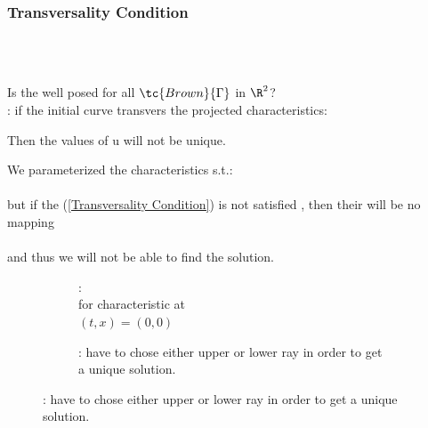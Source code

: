 \subsubsection{Transversality Condition}
\begin{defnbox}
    \begin{defn}\leavevmode \\
        \\
    \end{defn}
\end{defnbox}
\begin{sectionbox}[Question]
    Is the  well posed for all
    $\tc{Brown}{\Gamma}$ in $\R^2$?\\
    : if the initial curve transvers the projected characteristics:
        \begin{numberlist}
            \item {}
            \item {}
        \end{numberlist}
        Then the values of u will not be unique.
\end{sectionbox}
\begin{sectionbox}[Problem]
\nospacing
    We parameterized the characteristics s.t.:\\
    \\
    but if the  (\cref{Transversality Condition}) is not satisfied , then their will be no mapping\\
    \\
    and thus we will not be able to find the solution.
        \begin{figure}[H]
            \centering
            \begin{subfigure}{.5\columnwidth}
                \centering{
                    \def\svgwidth{100pt}
                    \resizebox{\linewidth}{!}{}
                }
                \caption{: \\ for characteristic at\\ $(t,x)=(0,0)$}
            \end{subfigure}%
            \begin{subfigure}{.5\columnwidth}
                \centering{
                    \def\svgwidth{100pt}
                    \resizebox{\linewidth}{!}{}
                }
                \caption{:  have to chose either upper or lower ray in order to get a unique solution.}
            \end{subfigure}
        \end{figure}
\end{sectionbox}
